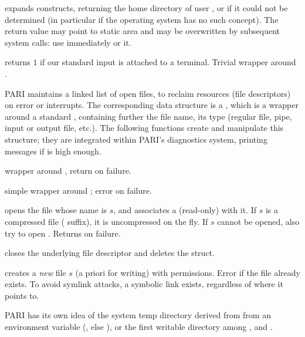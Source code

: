  expands 
constructs, returning the home directory of user , or  if
it could not be determined (in particular if the operating system has no such
concept). The return value may point to static area and may be overwritten
by subsequent system calls: use immediately or  it.

 returns $1$ if our standard input
 is attached to a terminal. Trivial wrapper around .


PARI maintains a linked list of open files, to reclaim resources
(file descriptors) on error or interrupts. The corresponding data structure
is a , which is a wrapper around a standard ,
containing further the file name, its type (regular file, pipe, input or
output file, etc.). The following functions create and manipulate this
structure; they are integrated within PARI's diagnostics system, printing
messages if  is high enough.

 wrapper
around , return  on failure.

simple wrapper around ; error on failure.

 opens the file whose name is
$s$,  and associates a (read-only)  with it. If $s$ is a
compressed file ( suffix), it is uncompressed on the fly.
If $s$ cannot be opened, also try to open . Returns 
on failure.

 closes
the underlying file descriptor and deletes the  struct.

creates a \emph{new} file $s$ (a priori for writing) with 
permissions. Error if the file already exists. To avoid symlink attacks,
a symbolic link exists, regardless of where it points to.


PARI has its own idea of the system temp directory derived from from an
environment variable (, else ), or the first
writable directory among ,  and .

